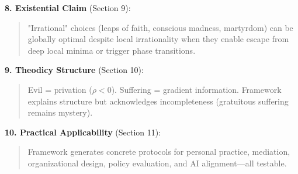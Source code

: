 \documentclass[11pt,a4paper]{article}
\theoremstyle{definition}
\theoremstyle{remark}
\newcommand{\CC}{\mathcal{C}}
\newcommand{\EE}{\mathbf{E}}
\newcommand{\WW}{\mathbf{W}}
\begin{document}
\begin{enumerate}
\begin{mdframed}[backgroundcolor=blue!5,linewidth=2pt]
\textbf{8. Existential Claim} (Section 9):
\begin{quote}
"Irrational" choices (leaps of faith, conscious madness, martyrdom) can be globally optimal despite local irrationality when they enable escape from deep local minima or trigger phase transitions.
\end{quote}

\textbf{9. Theodicy Structure} (Section 10):
\begin{quote}
Evil = privation (\(\rho < 0\)). Suffering = gradient information. Framework explains structure but acknowledges incompleteness (gratuitous suffering remains mystery).
\end{quote}

\textbf{10. Practical Applicability} (Section 11):
\begin{quote}
Framework generates concrete protocols for personal practice, mediation, organizational design, policy evaluation, and AI alignment—all testable.
\end{quote}
\end{mdframed}

\begin{figure}[H]
\centering
{}
\end{figure}
\end{enumerate}
\end{document}
